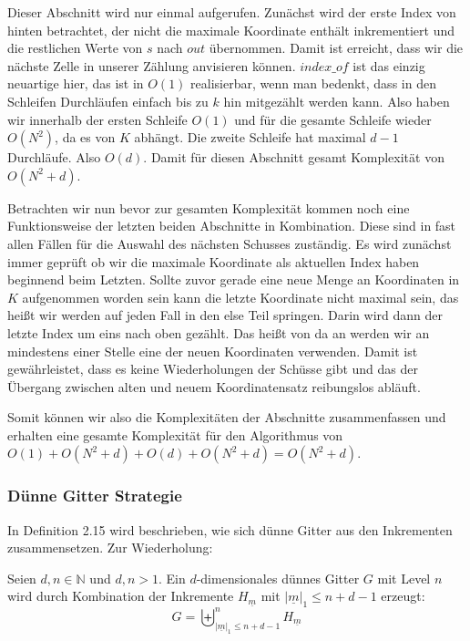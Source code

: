 \documentclass[a4paper,12pt]{llncs}
\numberwithin{equation}{section}
\begin{document}
Dieser Abschnitt wird nur einmal aufgerufen. Zunächst wird der erste Index von hinten betrachtet, der nicht die maximale Koordinate enthält inkrementiert und die restlichen Werte von $s$ nach $out$ übernommen. Damit ist erreicht, dass wir die nächste Zelle in unserer Zählung anvisieren können. $index\_of$ ist das einzig neuartige hier, das ist in $O(1)$ realisierbar, wenn man bedenkt, dass in den Schleifen Durchläufen einfach bis zu $k$ hin mitgezählt werden kann. Also haben wir innerhalb der ersten Schleife $O(1)$ und für die gesamte Schleife wieder $O\left(N^2\right)$, da es von $K$ abhängt. Die zweite Schleife hat maximal $d-1$ Durchläufe. Also $O(d)$. Damit für diesen Abschnitt gesamt Komplexität von $O\left(N^2+d\right)$.


Betrachten wir nun bevor zur gesamten Komplexität kommen noch eine Funktionsweise der letzten beiden Abschnitte in Kombination. Diese sind in fast allen Fällen für die Auswahl des nächsten Schusses zuständig. Es wird zunächst immer geprüft ob wir die maximale Koordinate als aktuellen Index haben beginnend beim Letzten. Sollte zuvor gerade eine neue Menge an Koordinaten in $K$ aufgenommen worden sein kann die letzte Koordinate nicht maximal sein, das heißt wir werden auf jeden Fall in den else Teil springen. Darin wird dann der letzte Index um eins nach oben gezählt. Das heißt von da an werden wir an mindestens einer Stelle eine der neuen Koordinaten verwenden. Damit ist gewährleistet, dass es keine Wiederholungen der Schüsse gibt und das der Übergang zwischen alten und neuem Koordinatensatz reibungslos abläuft.

Somit können wir also die Komplexitäten der Abschnitte zusammenfassen und erhalten eine gesamte Komplexität für den Algorithmus von $O(1)+O(N^2+d)+O(d)+O(N^2+d)=O(N^2+d)$.


\subsubsection{Dünne Gitter Strategie}

In \cite{M13} Definition 2.15 wird beschrieben, wie sich dünne Gitter aus den Inkrementen zusammensetzen. Zur Wiederholung:

\begin{definition}
	Seien $d,n\in\mathbb{N}$ und $d,n>1$. Ein $d$-dimensionales dünnes Gitter $G$ mit Level $n$ wird durch Kombination der Inkremente $H_{\underline{m}}$ mit $|\underline{m}|_1\leq n+d-1$ erzeugt:
	\begin{equation}
	G=\biguplus_{|\underline{m}|_1\leq n+d-1}^n H_{\underline{m}}
	\end{equation}
\end{definition}
\end{document}

